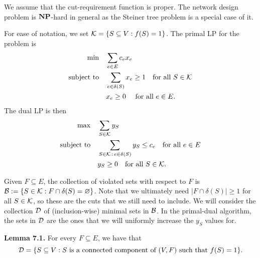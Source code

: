 \documentclass{article}
\DeclareMathOperator{\NP}{{\bf NP}}
\begin{document}
We assume that the cut-requirement function is proper. The network 
design problem is $\NP$-hard in general as the Steiner 
tree problem is a special case of it. 

For ease of notation, we set ${\cal K} = \{S \subseteq V : f(S) = 1\}$. 
The primal LP for the problem is 
\begin{align*}
    \min\quad & \sum_{e\in E} c_e x_e \\ 
    \text{subject to}\quad & \sum_{e\in \delta(S)} x_e \geq 1 
    \quad \text{for all $S \in {\cal K}$} \\
    & x_e \geq 0 \quad \text{ for all $e \in E$.}
\end{align*}
The dual LP is then 
\begin{align*}
    \max\quad & \sum_{S\in\mathcal{K}} y_S \\ 
    \text{subject to}\quad & \sum_{S\in\mathcal{K}\,:\,e \in \delta(S)} y_S \leq c_e 
    \quad \text{for all $e\in E$} \\
    & y_S \geq 0 \quad \text{for all $S \in {\cal K}$}.
\end{align*}

Given $F \subseteq E$, the collection of violated sets with respect to $F$ is 
${\cal B} := \{S \in {\cal K} : F \cap \delta(S) = \varnothing\}$. 
Note that we ultimately need $|F \cap \delta(S)| \geq 1$ for all $S \in {\cal K}$, 
so these are the cuts that we still need to include. We will 
consider the collection ${\cal D}$ of (inclusion-wise) minimal sets 
in ${\cal B}$. In the primal-dual algorithm, the sets in ${\cal D}$ 
are the ones that we will uniformly increase the $y_S$ values for.

{\color{violet}
{\bf Lemma 7.1.} For every $F \subseteq E$, we have that 
\[ {\cal D} = \{S \subseteq V : S \text{ is a connected component of 
$(V, F)$ such that $f(S) = 1$}\}. \] 
}
\end{document}
